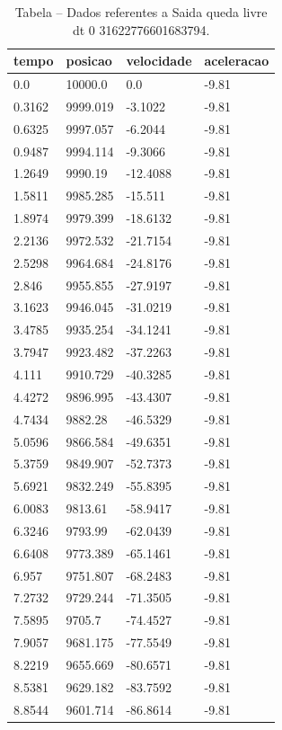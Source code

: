 \begin{table}[H]
\centering
\caption{Tabela – Dados referentes a Saida queda livre dt 0 31622776601683794.}
\label{tab:saida_queda_livre_dt_0_31622776601683794}
\begin{tabular}{llll}
\toprule
tempo & posicao & velocidade & aceleracao \\
\midrule
0.0 & 10000.0 & 0.0 & -9.81 \\
0.3162 & 9999.019 & -3.1022 & -9.81 \\
0.6325 & 9997.057 & -6.2044 & -9.81 \\
0.9487 & 9994.114 & -9.3066 & -9.81 \\
1.2649 & 9990.19 & -12.4088 & -9.81 \\
1.5811 & 9985.285 & -15.511 & -9.81 \\
1.8974 & 9979.399 & -18.6132 & -9.81 \\
2.2136 & 9972.532 & -21.7154 & -9.81 \\
2.5298 & 9964.684 & -24.8176 & -9.81 \\
2.846 & 9955.855 & -27.9197 & -9.81 \\
3.1623 & 9946.045 & -31.0219 & -9.81 \\
3.4785 & 9935.254 & -34.1241 & -9.81 \\
3.7947 & 9923.482 & -37.2263 & -9.81 \\
4.111 & 9910.729 & -40.3285 & -9.81 \\
4.4272 & 9896.995 & -43.4307 & -9.81 \\
4.7434 & 9882.28 & -46.5329 & -9.81 \\
5.0596 & 9866.584 & -49.6351 & -9.81 \\
5.3759 & 9849.907 & -52.7373 & -9.81 \\
5.6921 & 9832.249 & -55.8395 & -9.81 \\
6.0083 & 9813.61 & -58.9417 & -9.81 \\
6.3246 & 9793.99 & -62.0439 & -9.81 \\
6.6408 & 9773.389 & -65.1461 & -9.81 \\
6.957 & 9751.807 & -68.2483 & -9.81 \\
7.2732 & 9729.244 & -71.3505 & -9.81 \\
7.5895 & 9705.7 & -74.4527 & -9.81 \\
7.9057 & 9681.175 & -77.5549 & -9.81 \\
8.2219 & 9655.669 & -80.6571 & -9.81 \\
8.5381 & 9629.182 & -83.7592 & -9.81 \\
8.8544 & 9601.714 & -86.8614 & -9.81 \\

\end{tabular}
\end{table}
